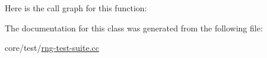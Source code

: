 Here is the call graph for this function\+:




The documentation for this class was generated from the following file\+:\begin{DoxyCompactItemize}
\item 
core/test/\hyperlink{rng-test-suite_8cc}{rng-\/test-\/suite.\+cc}\end{DoxyCompactItemize}
